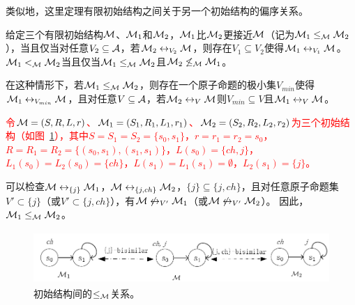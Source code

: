 类似地，这里定理有限初始结构之间关于另一个初始结构的偏序关系。
\begin{definition}\label{def:closer}
	给定三个有限初始结构${\cal M}$、${\cal M}_1$和${\cal M}_2$，${\cal M}_1$比${\cal M}_2$更接近${\cal M}$（记为${\cal M}_1 \leq_{{\cal M}} {\cal M}_2$），当且仅当对任意$V_2 \subseteq \mathcal{A}$，若${\cal M}_2 \leftrightarrow_{V_2} {\cal M}$，则存在$V_1 \subseteq V_2$使得${\cal M}_1 \leftrightarrow_{V_1} {\cal M}$。
	${\cal M}_1 <_{{\cal M}} {\cal M}_2$当且仅当${\cal M}_1 \leq_{{\cal M}} {\cal M}_2$且${\cal M}_2 \not \leq_{{\cal M}} {\cal M}_1$。
\end{definition}

在这种情形下，若${\cal M}_1 \leq_{{\cal M}} {\cal M}_2$，则存在一个原子命题的极小集$V_{min}$使得${\cal M}_1 \leftrightarrow_{V_{min}} {\cal M}$，且对任意$V\subseteq {\cal A}$，若${\cal M}_2 \leftrightarrow_V {\cal M}$则$V_{min}\subseteq V$且${\cal M}_1 \leftrightarrow_V {\cal M}$。
\begin{example}
	\textcolor{red}{令${\cal M}= (S, R, L, r)$、${\cal M}_1 = (S_1, R_1, L_1, r_1)$、${\cal M}_2 = (S_2, R_2, L_2, r_2)$为三个初始结构（如图~\ref{fig:partialo}），其中$S = S_1 = S_2 = \{s_0, s_1\}$，$r=r_1=r_2= s_0$，$R=R_1=R_2=\{(s_0, s_1), (s_1, s_1)\}$，$L(s_0) = \{ch, j\}$，$L_1(s_0) = L_2(s_0) = \{ch\}$，$L(s_1) = L_1(s_1)=\emptyset$，$L_2(s_1) = \{j\}$。}
	
	可以检查${\cal M} \leftrightarrow_{\{j\}} {\cal M}_1$，${\cal M} \leftrightarrow_{\{j,ch\}} {\cal M}_2$，$\{j\}\subseteq \{j,ch\}$，且对任意原子命题集$V' \subset \{j\}$（或$V' \subset \{j,ch\}$），有${\cal M} \not\leftrightarrow_{V'} {\cal M}_1$（或${\cal M} \not \leftrightarrow_{V'} {\cal M}_2$）。
	因此，${\cal M}_1 \leq_{{\cal M}} {\cal M}_2$。
	\begin{figure}[h]%
		\centering
		\includegraphics[width=12cm,height=2cm]{figures/chapter06/partial_order.png}
		\caption{初始结构间的$\leq_{{\cal M}}$关系。}\label{fig:partialo}
		
	\end{figure}
\end{example}


